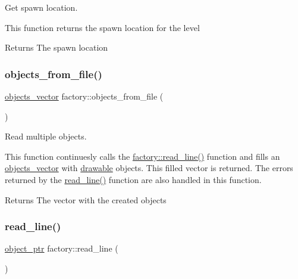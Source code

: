 Get spawn location. 

This function returns the spawn location for the level

\begin{DoxyReturn}{Returns}
The spawn location 
\end{DoxyReturn}
\mbox{\label{classfactory_afb2fad4ac9b0f39b1bfc3f3fc8d218b6}} 
\subsubsection{\texorpdfstring{objects\+\_\+from\+\_\+file()}{objects\_from\_file()}}
{\footnotesize\ttfamily \hyperlink{typedefs_8hpp_a6c0fdb1dfd0c34dbbdbb5dcd3c608b07}{objects\+\_\+vector} factory\+::objects\+\_\+from\+\_\+file (\begin{DoxyParamCaption}{ }\end{DoxyParamCaption})}



Read multiple objects. 

This function continuesly calls the \hyperlink{classfactory_a82385866bc910c1b3a3e82d56487dd24}{factory\+::read\+\_\+line()} function and fills an \hyperlink{typedefs_8hpp_a6c0fdb1dfd0c34dbbdbb5dcd3c608b07}{objects\+\_\+vector} with \hyperlink{classdrawable}{drawable} objects. This filled vector is returned. The errors returned by the \hyperlink{classfactory_a82385866bc910c1b3a3e82d56487dd24}{read\+\_\+line()} function are also handled in this function. \begin{DoxyReturn}{Returns}
The vector with the created objects 
\end{DoxyReturn}
\mbox{\label{classfactory_a82385866bc910c1b3a3e82d56487dd24}} 
\subsubsection{\texorpdfstring{read\+\_\+line()}{read\_line()}}
{\footnotesize\ttfamily \hyperlink{typedefs_8hpp_aab5add95f06d2ba25dbfed8eb07274fa}{object\+\_\+ptr} factory\+::read\+\_\+line (\begin{DoxyParamCaption}{ }\end{DoxyParamCaption})}



